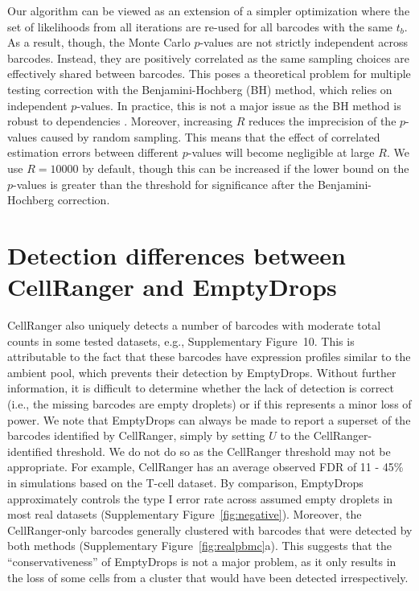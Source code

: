 \documentclass{article}
\begin{document}
Our algorithm can be viewed as an extension of a simpler optimization where the set of likelihoods from all iterations are re-used for all barcodes with the same $t_b$.
As a result, though, the Monte Carlo $p$-values are not strictly independent across barcodes.
Instead, they are positively correlated as the same sampling choices are effectively shared between barcodes.
This poses a theoretical problem for multiple testing correction with the Benjamini-Hochberg (BH) method, which relies on independent $p$-values.
In practice, this is not a major issue as the BH method is robust to dependencies \cite{reiner2003identifying,kim2008effects}.
Moreover, increasing $R$ reduces the imprecision of the $p$-values caused by random sampling.
This means that the effect of correlated estimation errors between different $p$-values will become negligible at large $R$.
We use $R=10000$ by default, though this can be increased if the lower bound on the $p$-values \cite{phipson2010permutation} is greater than the threshold for significance after the Benjamini-Hochberg correction.

\section{Detection differences between CellRanger and EmptyDrops}
CellRanger also uniquely detects a number of barcodes with moderate total counts in some tested datasets, e.g., Supplementary Figure~10.
This is attributable to the fact that these barcodes have expression profiles similar to the ambient pool, which prevents their detection by EmptyDrops.
Without further information, it is difficult to determine whether the lack of detection is correct (i.e., the missing barcodes are empty droplets) or if this represents a minor loss of power.
We note that EmptyDrops can always be made to report a superset of the barcodes identified by CellRanger, simply by setting $U$ to the CellRanger-identified threshold.
We do not do so as the CellRanger threshold may not be appropriate.
For example, CellRanger has an average observed FDR of 11 - 45\% in simulations based on the T-cell dataset. 
By comparison, EmptyDrops approximately controls the type I error rate across assumed empty droplets in most real datasets (Supplementary Figure~\ref{fig:negative}).
Moreover, the CellRanger-only barcodes generally clustered with barcodes that were detected by both methods (Supplementary Figure~\ref{fig:realpbmc}a).
This suggests that the ``conservativeness'' of EmptyDrops is not a major problem, as it only results in the loss of some cells from a cluster that would have been detected irrespectively.
\end{document}
